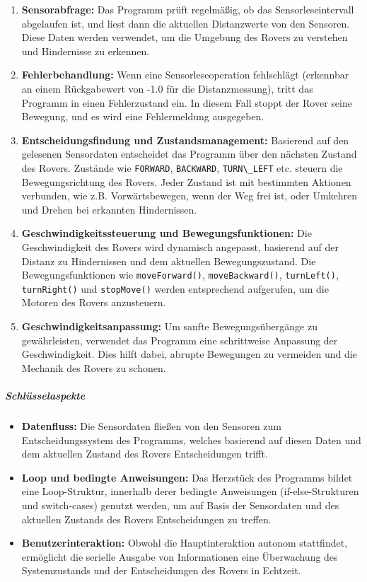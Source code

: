 \documentclass{vorlage-design-main}
\begin{document}
\begin{enumerate}
\def\labelenumi{\arabic{enumi}.}
\item
  \textbf{Sensorabfrage:} Das Programm prüft regelmäßig, ob das
  Sensorleseintervall abgelaufen ist, und liest dann die aktuellen
  Distanzwerte von den Sensoren. Diese Daten werden verwendet, um die
  Umgebung des Rovers zu verstehen und Hindernisse zu erkennen.
\item
  \textbf{Fehlerbehandlung:} Wenn eine Sensorleseoperation fehlschlägt
  (erkennbar an einem Rückgabewert von -1.0 für die Distanzmessung),
  tritt das Programm in einen Fehlerzustand ein. In diesem Fall stoppt
  der Rover seine Bewegung, und es wird eine Fehlermeldung ausgegeben.
\item
  \textbf{Entscheidungsfindung und Zustandsmanagement:} Basierend auf
  den gelesenen Sensordaten entscheidet das Programm über den nächsten
  Zustand des Rovers. Zustände wie \verb|FORWARD|,
  \verb|BACKWARD|,
  \verb|TURN\_LEFT| etc. steuern die
  Bewegungsrichtung des Rovers. Jeder Zustand ist mit bestimmten
  Aktionen verbunden, wie z.B. Vorwärtsbewegen, wenn der Weg frei ist,
  oder Umkehren und Drehen bei erkannten Hindernissen.
\item
  \textbf{Geschwindigkeitssteuerung und Bewegungsfunktionen:} Die
  Geschwindigkeit des Rovers wird dynamisch angepasst, basierend auf der
  Distanz zu Hindernissen und dem aktuellen Bewegungszustand. Die
  Bewegungsfunktionen wie \verb|moveForward()|,
  \verb|moveBackward()|,
  \verb|turnLeft()|,
  \verb|turnRight()| und
  \verb|stopMove()| werden entsprechend aufgerufen,
  um die Motoren des Rovers anzusteuern.
\item
  \textbf{Geschwindigkeitsanpassung:} Um sanfte Bewegungsübergänge zu
  gewährleisten, verwendet das Programm eine schrittweise Anpassung der
  Geschwindigkeit. Dies hilft dabei, abrupte Bewegungen zu vermeiden und
  die Mechanik des Rovers zu schonen.
\end{enumerate}

\hypertarget{schluxfcsselaspekte}{%
\subparagraph{Schlüsselaspekte}\label{schluesselaspekte}}

\begin{itemize}

\item
  \textbf{Datenfluss:} Die Sensordaten fließen von den Sensoren zum
  Entscheidungssystem des Programms, welches basierend auf diesen Daten
  und dem aktuellen Zustand des Rovers Entscheidungen trifft.
\item
  \textbf{Loop und bedingte Anweisungen:} Das Herzstück des Programms
  bildet eine Loop-Struktur, innerhalb derer bedingte Anweisungen
  (if-else-Strukturen und switch-cases) genutzt werden, um auf Basis der
  Sensordaten und des aktuellen Zustands des Rovers Entscheidungen zu
  treffen.
\item
  \textbf{Benutzerinteraktion:} Obwohl die Hauptinteraktion autonom
  stattfindet, ermöglicht die serielle Ausgabe von Informationen eine
  Überwachung des Systemzustands und der Entscheidungen des Rovers in
  Echtzeit.
\end{itemize}
\end{document}
